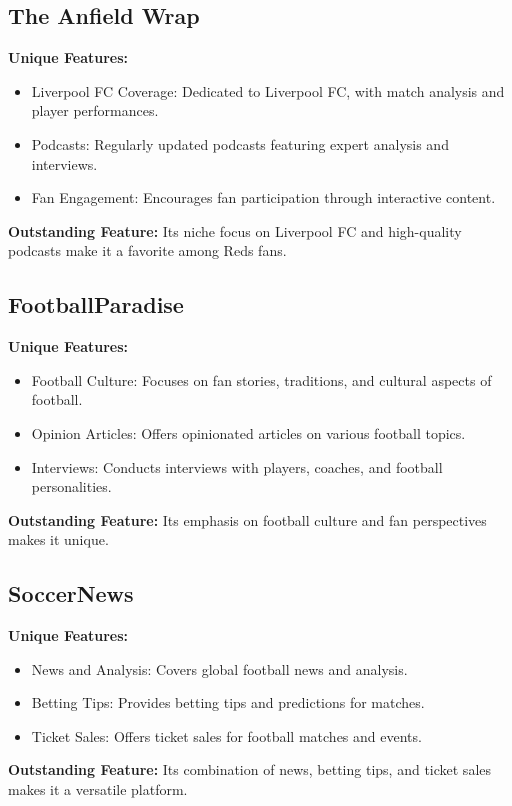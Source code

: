 \subsection{The Anfield Wrap}
\textbf{Unique Features:}
\begin{itemize}
    \item Liverpool FC Coverage: Dedicated to Liverpool FC, with match analysis and player performances.
    \item Podcasts: Regularly updated podcasts featuring expert analysis and interviews.
    \item Fan Engagement: Encourages fan participation through interactive content.
\end{itemize}
\textbf{Outstanding Feature:} Its niche focus on Liverpool FC and high-quality podcasts make it a favorite among Reds fans.

\subsection{FootballParadise}
\textbf{Unique Features:}
\begin{itemize}
    \item Football Culture: Focuses on fan stories, traditions, and cultural aspects of football.
    \item Opinion Articles: Offers opinionated articles on various football topics.
    \item Interviews: Conducts interviews with players, coaches, and football personalities.
\end{itemize}
\textbf{Outstanding Feature:} Its emphasis on football culture and fan perspectives makes it unique.

\subsection{SoccerNews}
\textbf{Unique Features:}
\begin{itemize}
    \item News and Analysis: Covers global football news and analysis.
    \item Betting Tips: Provides betting tips and predictions for matches.
    \item Ticket Sales: Offers ticket sales for football matches and events.
\end{itemize}
\textbf{Outstanding Feature:} Its combination of news, betting tips, and ticket sales makes it a versatile platform.

